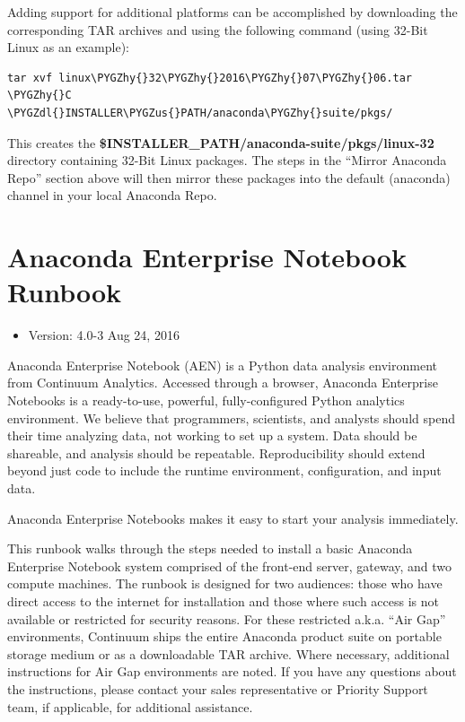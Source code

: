 \documentclass[letterpaper,10pt,openany,oneside]{sphinxmanual}
\def\PYGZus{\char`\_}
\def\PYGZdl{\char`\$}
\def\PYGZhy{\char`\-}
\begin{document}
Adding support for additional platforms can be accomplished by downloading the corresponding TAR archives and using the following command (using 32-Bit Linux as an example):

\begin{Verbatim}[commandchars=\\\{\}]
tar xvf linux\PYGZhy{}32\PYGZhy{}2016\PYGZhy{}07\PYGZhy{}06.tar \PYGZhy{}C \PYGZdl{}INSTALLER\PYGZus{}PATH/anaconda\PYGZhy{}suite/pkgs/
\end{Verbatim}

This creates the \textbf{\$INSTALLER\_PATH/anaconda-suite/pkgs/linux-32} directory containing 32-Bit Linux packages.
The steps in the ``Mirror Anaconda Repo'' section above will then mirror these packages into the default (anaconda) channel in your local Anaconda Repo.


\chapter{Anaconda Enterprise Notebook Runbook}
\label{AnacondaEnterpriseNotebooks:anaconda-enterprise-notebook-runbook}\label{AnacondaEnterpriseNotebooks::doc}\begin{itemize}
\item {} 
Version: 4.0-3 \textbar{} Aug 24, 2016

\end{itemize}

Anaconda Enterprise Notebook (AEN) is a Python data analysis environment from
Continuum Analytics. Accessed through a browser, Anaconda Enterprise
Notebooks is a ready-to-use, powerful, fully-configured Python analytics
environment. We believe that programmers, scientists, and analysts
should spend their time analyzing data, not working to set up a system.
Data should be shareable, and analysis should be repeatable.
Reproducibility should extend beyond just code to include the runtime
environment, configuration, and input data.

Anaconda Enterprise Notebooks makes it easy to start your analysis
immediately.

This runbook walks through the steps needed to install a basic Anaconda
Enterprise Notebook system comprised of the front-end server, gateway,
and two compute machines. The runbook is designed for two audiences:
those who have direct access to the internet for installation and those
where such access is not available or restricted for security reasons.
For these restricted a.k.a. ``Air Gap'' environments, Continuum ships the
entire Anaconda product suite on portable storage medium or as a
downloadable TAR archive. Where necessary, additional instructions for
Air Gap environments are noted. If you have any questions about the
instructions, please contact your sales representative or Priority
Support team, if applicable, for additional assistance.
\end{document}
